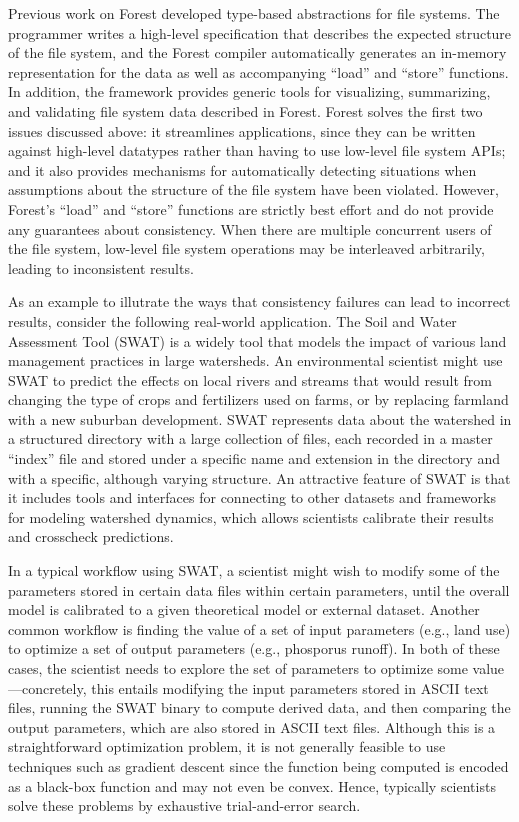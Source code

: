 %
%
Previous work on Forest developed type-based abstractions for file
systems. The programmer writes a high-level specification that
describes the expected structure of the file system, and the Forest
compiler automatically generates an in-memory representation for the
data as well as accompanying ``load'' and ``store'' functions. In
addition, the framework provides generic tools for visualizing,
summarizing, and validating file system data described in
Forest. Forest solves the first two issues discussed above: it
streamlines applications, since they can be written against high-level
datatypes rather than having to use low-level file system APIs; and it
also provides mechanisms for automatically detecting situations when
assumptions about the structure of the file system have been
violated. However, Forest's ``load'' and ``store'' functions are
strictly best effort and do not provide any guarantees about
consistency. When there are multiple concurrent users of the file
system, low-level file system operations may be interleaved
arbitrarily, leading to inconsistent results.

%
%
As an example to illutrate the ways that consistency failures can lead
to incorrect results, consider the following real-world
application. The Soil and Water Assessment Tool (SWAT) is a widely
tool that models the impact of various land management practices in
large watersheds. An environmental scientist might use SWAT to predict
the effects on local rivers and streams that would result from
changing the type of crops and fertilizers used on farms, or by
replacing farmland with a new suburban development. SWAT represents
data about the watershed in a structured directory with a large
collection of files, each recorded in a master ``index'' file and
stored under a specific name and extension in the directory and with a
specific, although varying structure. An attractive feature of SWAT is
that it includes tools and interfaces for connecting to other datasets
and frameworks for modeling watershed dynamics, which allows
scientists calibrate their results and crosscheck predictions.

%
%
In a typical workflow using SWAT, a scientist might wish to modify
some of the parameters stored in certain data files within certain
parameters, until the overall model is calibrated to a given
theoretical model or external dataset. Another common workflow is
finding the value of a set of input parameters (e.g., land use) to
optimize a set of output parameters (e.g., phosporus runoff). In both
of these cases, the scientist needs to explore the set of parameters
to optimize some value---concretely, this entails modifying the input
parameters stored in ASCII text files, running the SWAT binary to
compute derived data, and then comparing the output parameters, which
are also stored in ASCII text files. Although this is a
straightforward optimization problem, it is not generally feasible to
use techniques such as gradient descent since the function being
computed is encoded as a black-box function and may not even be
convex. Hence, typically scientists solve these problems by exhaustive
trial-and-error search.

